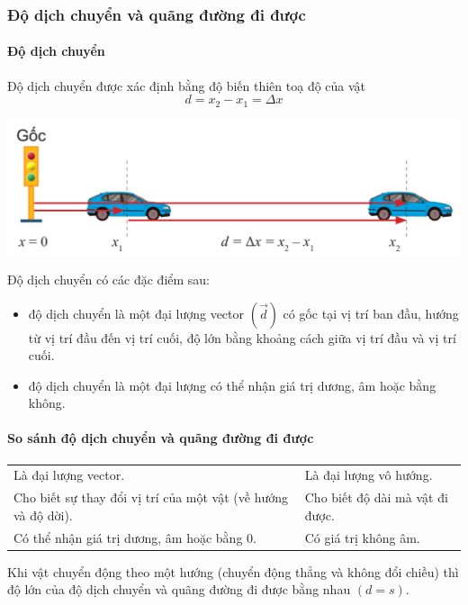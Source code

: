 \begin{tomtat}
	\subsubsection{Độ dịch chuyển và quãng đường đi được}
	\paragraph{Độ dịch chuyển}
	\begin{dn}
		Độ dịch chuyển được xác định bằng độ biến thiên toạ độ của vật
		$$d=x_2-x_1=\Delta x$$
	\end{dn}
	\begin{center}
		\includegraphics[scale=0.5]{figs/G10Y25B3-3}
	\end{center}
	\begin{tc}
		Độ dịch chuyển có các đặc điểm sau:
		\begin{itemize}
			\item độ dịch chuyển là một đại lượng vector $\left(\vec{d}\right)$ có gốc tại vị trí ban đầu, hướng từ vị trí đầu đến vị trí cuối, độ lớn bằng khoảng cách giữa vị trí đầu và vị trí cuối.
			\item độ dịch chuyển là một đại lượng có thể nhận giá trị dương, âm hoặc bằng không. 
		\end{itemize}
	\end{tc}
	\paragraph{So sánh độ dịch chuyển và quãng đường đi được}
	\begin{longtable}{|m{20em}|m{20em}|}
		\hline
		\thead{Độ dịch chuyển $\left(\vec{d}\right)$} & \thead{Quãng đường $\left(s\right)$}\\
		\hline
		Là đại lượng vector. & Là đại lượng vô hướng.\\
		\hline
		Cho biết sự thay đổi vị trí của một vật (về hướng và độ dời). & Cho biết độ dài mà vật đi được.\\
		\hline
		Có thể nhận giá trị dương, âm hoặc bằng 0. & Có giá trị không âm.\\
		\hline
	\end{longtable}
	\begin{luuy}
		Khi vật chuyển động theo một hướng (chuyển động thẳng và không đổi chiều) thì độ lớn của độ dịch chuyển và quãng đường đi được bằng nhau $(d=s)$.
	\end{luuy}

\end{tomtat}
